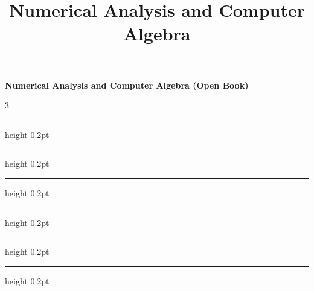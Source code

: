 \documentclass[10pt,landscape]{article}
\title{Numerical Analysis and Computer Algebra}
\renewcommand{\hrulefill}{\leavevmode\leaders\hrule height 0.2pt \hfill\kern0pt\relax}
\begin{document}
    \raggedright
    \footnotesize

    \begin{center}
        \textbf{Numerical Analysis and Computer Algebra (Open Book)} \\
    \end{center}
    \begin{multicols}{3}
        \setlength{\premulticols}{1pt}
        \setlength{\postmulticols}{1pt}
        \setlength{\multicolsep}{1pt}
        \setlength{\columnsep}{2pt}

        

        \hrulefill
        \hspace{.5cm}

        

        \hrulefill
        \hspace{.5cm}

        

        \hrulefill
        \hspace{.5cm}

        

        \hrulefill
        \hspace{.5cm}

        

        \hrulefill
        \hspace{.5cm}

        

        \hrulefill
        \hspace{.5cm}

        \newpage
        
    \end{multicols}
\end{document}

